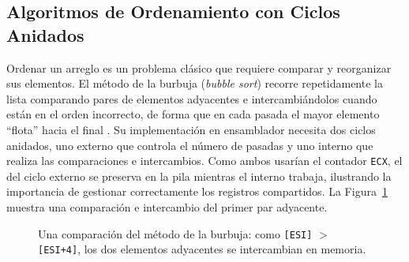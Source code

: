 \documentclass[a4paper,12pt]{article}
\begin{document}
\subsection{Algoritmos de Ordenamiento con Ciclos Anidados}
Ordenar un arreglo es un problema clásico que requiere comparar y reorganizar sus elementos. El método de la burbuja (\textit{bubble sort}) recorre repetidamente la lista comparando pares de elementos adyacentes e intercambiándolos cuando están en el orden incorrecto, de forma que en cada pasada el mayor elemento ``flota'' hacia el final \cite{patterson2016computer}. Su implementación en ensamblador necesita dos ciclos anidados, uno externo que controla el número de pasadas y uno interno que realiza las comparaciones e intercambios. Como ambos usarían el contador \texttt{ECX}, el del ciclo externo se preserva en la pila mientras el interno trabaja, ilustrando la importancia de gestionar correctamente los registros compartidos. La Figura~\ref{fig:burbuja} muestra una comparación e intercambio del primer par adyacente.

\begin{figure}[H]
\centering
{}
\caption{Una comparación del método de la burbuja: como \texttt{[ESI]} $>$ \texttt{[ESI+4]}, los dos elementos adyacentes se intercambian en memoria.}
\label{fig:burbuja}
\end{figure}
\end{document}
